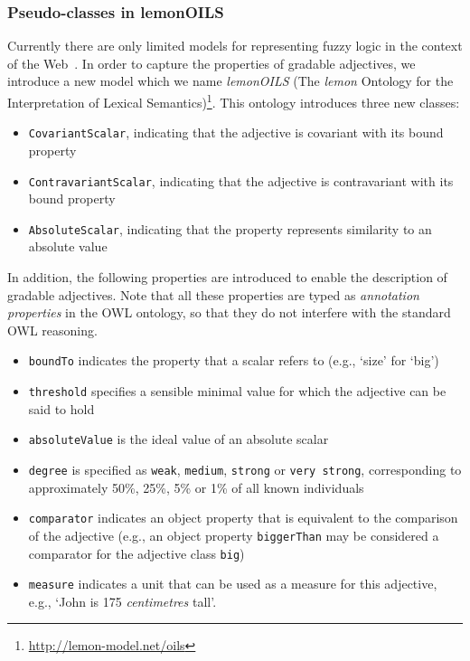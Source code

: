 \documentclass[11pt]{article}
\begin{document}
\subsubsection{Pseudo-classes in lemonOILS}

Currently there are only limited models for representing fuzzy 
logic in the context of the Web~\cite{zhao2008uncertainty}. In order to capture the 
properties of gradable adjectives, we introduce a new model which we name 
\emph{lemonOILS} (The \emph{lemon} Ontology for the Interpretation of Lexical Semantics)\footnote{\url{http://lemon-model.net/oils}}. This ontology introduces three 
new classes:

\begin{itemize}[noitemsep]
	\item {\tt CovariantScalar}, indicating that the adjective is covariant with its bound property
	\item {\tt ContravariantScalar}, indicating that the adjective is contravariant with its bound property
	\item {\tt AbsoluteScalar}, indicating that the property represents similarity to an absolute value
\end{itemize}

In addition, the following properties are introduced to enable the description 
of gradable adjectives. Note that all these properties are typed as 
\emph{annotation properties} in the OWL ontology, so that they do not interfere 
with the standard OWL reasoning.

\begin{itemize}[noitemsep]
	\item {\tt boundTo} indicates the property that a scalar refers to (e.g., `size' for `big')
	\item {\tt threshold} specifies a sensible minimal value for which the adjective can be said to hold
        \item {\tt absoluteValue} is the ideal value of an absolute scalar
	\item {\tt degree} is specified as {\tt weak}, {\tt medium}, {\tt strong} or {\tt very strong}, corresponding to approximately 50\%, 25\%, 5\% or 1\% of all known individuals
	\item {\tt comparator} indicates an object property that is equivalent to the comparison of the adjective (e.g., an object property {\tt biggerThan} may be considered a comparator for the adjective class {\tt big})
	\item {\tt measure} indicates a unit that can be used as a measure for this adjective, e.g., `John is 175 \textit{centimetres} tall'.
\end{itemize}
\end{document}
